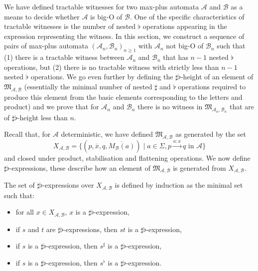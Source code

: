 \documentclass{lmcs}
\theoremstyle{remark}
\newcommand{\ideal}{\mathfrak{M}}
\newcommand{\autA}{\mathcal{A}}
\newcommand{\autB}{\mathcal{B}}
\theoremstyle{remark}
\begin{document}
We have defined tractable witnesses for two max-plus automata $\autA$ and $\autB$ as a means to decide whether $\autA$ is big-O of $\autB$. One of the specific characteristics of tractable witnesses is the number of nested $\flat$ operations appearing in the expression representing the witness. In this section, we construct a sequence of pairs of max-plus automata $(\autA_n, \autB_n)_{n\geq 1}$ with $\autA_n$ not big-O of $\autB_n$ such that (1) there is a tractable witness between $\autA_n$ and $\autB_n$ that has $n-1$ nested $\flat$ operations, but (2) there is no tractable witness with strictly less than $n-1$ nested $\flat$ operations. We go even further by defining the $\sharp\flat$-height of an element of $\ideal_{\autA,\autB}$ (essentially the minimal number of nested $\sharp$ and $\flat$ operations required to produce this element from the basic elements corresponding to the letters and product) and we prove that for $\autA_n$ and $\autB_n$ there is no witness in $\ideal_{\autA_n,\autB_n}$ that are of $\sharp\flat$-height less than $n$. 

Recall that, for $\autA$ deterministic, we have defined $\ideal_{\autA,\autB}$ as generated by the set 
$$X_{\autA, \autB} = \{(p,\overline{x},q,\overline{M_\autB(a)}) \mid a\in \Sigma, p\xrightarrow{a:x}q \text{ in } \autA\}$$ 
and closed under product, stabilisation and flattening operations. We now define $\sharp\flat$-expressions, these describe how an element of $\ideal_{\autA,\autB}$ is generated from $X_{\autA, \autB}$.

\begin{defi}
The set of $\sharp\flat$-expressions over $X_{\autA, \autB}$ is defined by induction as the minimal set such that:
\begin{itemize}
\item for all $x \in X_{\autA, \autB}$, $x$ is a $\sharp\flat$-expression,
\item if $s$ and $t$ are $\sharp\flat$-expressions, then $st$ is a $\sharp\flat$-expression,
\item if $s$ is a $\sharp\flat$-expression, then $s^\sharp$ is a $\sharp\flat$-expression,
\item if $s$ is a $\sharp\flat$-expression, then $s^\flat$ is a $\sharp\flat$-expression.
\end{itemize} 
\end{defi}
\end{document}
